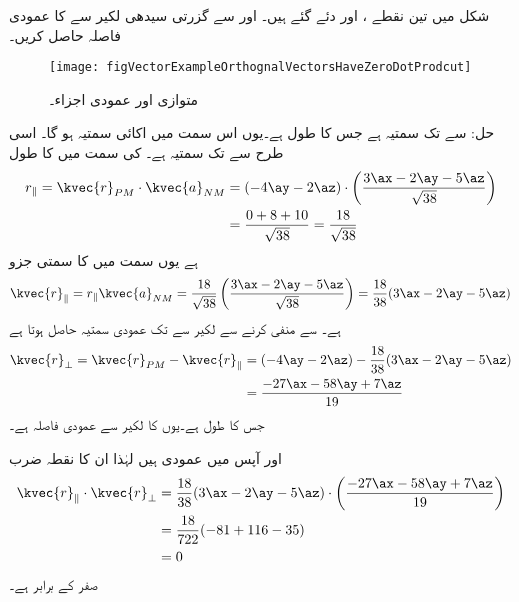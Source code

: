 شکل  میں تین نقطے ،  اور  دئے گئے ہیں۔  اور  سے گزرتی سیدھی لکیر سے  کا عمودی فاصلہ حاصل کریں۔ 
\begin{figure}
\centering
\texttt{[image: figVectorExampleOrthognalVectorsHaveZeroDotProdcut]}
\caption{متوازی اور عمودی اجزاء۔}
\label{شکل_سمتیہ_مثال_عمودی_سمتیات_کا_نقطہ_ضرب_صفر}
\end{figure}

حل: سے  تک سمتیہ  ہے جس کا طول  ہے۔یوں اس سمت میں اکائی سمتیہ  ہو گا۔ اسی طرح  سے  تک سمتیہ  ہے۔ کی سمت میں  کا طول
\begin{align*}
r_{\parallel}=\kvec{r}_{PM} \cdot \kvec{a}_{NM}&=(-4\ay-2\az) \cdot \left(\frac{3\ax-2\ay-5\az}{\sqrt{38}}\right) \\
&=\frac{0+8+10}{\sqrt{38}}=\frac{18}{\sqrt{38}}
\end{align*}
ہے یوں  سمت میں  کا سمتی جزو
\begin{align*}
\kvec{r}_{\parallel}=r_{\parallel} \kvec{a}_{NM}=\frac{18}{\sqrt{38}}\left(\frac{3\ax-2\ay-5\az}{\sqrt{38}}\right)=\frac{18}{38} (3\ax-2\ay-5\az)
\end{align*}
ہے۔ سے  منفی کرنے سے لکیر سے  تک عمودی سمتیہ  حاصل ہوتا ہے
\begin{align*}
\kvec{r}_{\perp}=\kvec{r}_{PM}-\kvec{r}_{\parallel}&=(-4\ay-2\az)-\frac{18}{38} (3\ax-2\ay-5\az)\\
&=\frac{-27\ax-58\ay+7\az}{19}
\end{align*}
جس کا طول  ہے۔یوں  کا لکیر سے عمودی فاصلہ  ہے۔

 اور  آپس میں عمودی ہیں لہٰذا ان  کا نقطہ ضرب
\begin{align*}
\kvec{r}_\parallel \cdot \kvec{r}_\perp&=\frac{18}{38} (3\ax-2\ay-5\az) \cdot \left(\frac{-27\ax-58\ay+7\az}{19}\right)\\
&=\frac{18}{722}(-81+116-35)\\
&=0
\end{align*}
صفر کے برابر ہے۔

